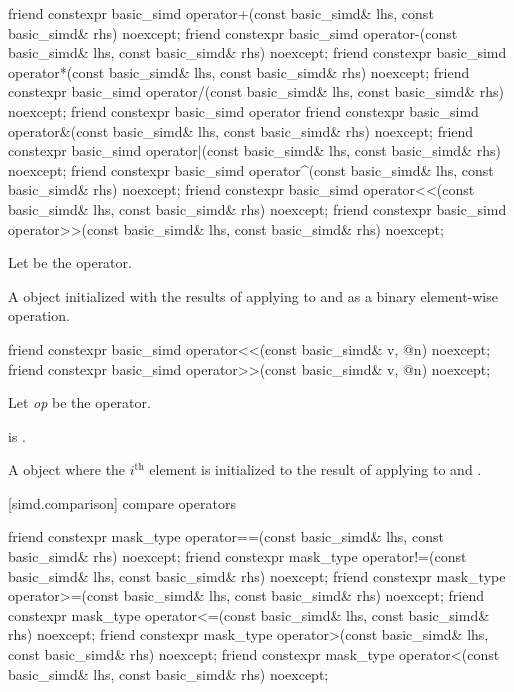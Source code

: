 \begin{itemdecl}
friend constexpr basic_simd operator+(const basic_simd& lhs, const basic_simd& rhs) noexcept;
friend constexpr basic_simd operator-(const basic_simd& lhs, const basic_simd& rhs) noexcept;
friend constexpr basic_simd operator*(const basic_simd& lhs, const basic_simd& rhs) noexcept;
friend constexpr basic_simd operator/(const basic_simd& lhs, const basic_simd& rhs) noexcept;
friend constexpr basic_simd operator%
friend constexpr basic_simd operator&(const basic_simd& lhs, const basic_simd& rhs) noexcept;
friend constexpr basic_simd operator|(const basic_simd& lhs, const basic_simd& rhs) noexcept;
friend constexpr basic_simd operator^(const basic_simd& lhs, const basic_simd& rhs) noexcept;
friend constexpr basic_simd operator<<(const basic_simd& lhs, const basic_simd& rhs) noexcept;
friend constexpr basic_simd operator>>(const basic_simd& lhs, const basic_simd& rhs) noexcept;
\end{itemdecl}

\begin{itemdescr}
  \pnum Let \op{} be the operator.

  \pnum\ConstraintOperatorTWellFormed

  \pnum\returns
  A  object initialized with the results of applying \op{} to  and
   as a binary element-wise operation.
\end{itemdescr}

\begin{itemdecl}
friend constexpr basic_simd operator<<(const basic_simd& v, @\simdsizetype@ n) noexcept;
friend constexpr basic_simd operator>>(const basic_simd& v, @\simdsizetype@ n) noexcept;
\end{itemdecl}

\begin{itemdescr}
  \pnum Let \textit{op} be the operator.

  \pnum\constraints
   is .

  \pnum\returns
  A  object where the $i^\text{th}$ element is initialized to the result of
  applying \op{} to  and  \foralli.
\end{itemdescr}

[simd.comparison]{ compare operators}

\begin{itemdecl}
friend constexpr mask_type operator==(const basic_simd& lhs, const basic_simd& rhs) noexcept;
friend constexpr mask_type operator!=(const basic_simd& lhs, const basic_simd& rhs) noexcept;
friend constexpr mask_type operator>=(const basic_simd& lhs, const basic_simd& rhs) noexcept;
friend constexpr mask_type operator<=(const basic_simd& lhs, const basic_simd& rhs) noexcept;
friend constexpr mask_type operator>(const basic_simd& lhs, const basic_simd& rhs) noexcept;
friend constexpr mask_type operator<(const basic_simd& lhs, const basic_simd& rhs) noexcept;
\end{itemdecl}

